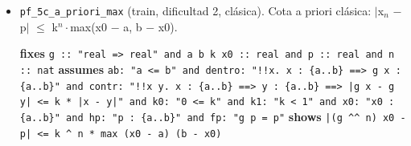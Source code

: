 \documentclass[11pt,a4paper]{article}
\begin{document}
\begin{itemize}
  {\footnotesize \textbf{fixes} \texttt{g :\allowbreak{}:\allowbreak{} "real =\allowbreak{}> real" and a b k x0 :\allowbreak{}:\allowbreak{} real and p :\allowbreak{}:\allowbreak{} real and n :\allowbreak{}:\allowbreak{} nat} \textbf{assumes} \texttt{ab:\allowbreak{} "a <=\allowbreak{} b" and dentro:\allowbreak{} "!{}!x. x :\allowbreak{} \{a..b\} =\allowbreak{}=\allowbreak{}> g x :\allowbreak{} \{a..b\}" and contr:\allowbreak{} "!{}!x y. x :\allowbreak{} \{a..b\} =\allowbreak{}=\allowbreak{}> y :\allowbreak{} \{a..b\} =\allowbreak{}=\allowbreak{}> |\allowbreak{}g x -\allowbreak{} g y|\allowbreak{} <=\allowbreak{} k *\allowbreak{} |\allowbreak{}x -\allowbreak{} y|\allowbreak{}" and k0:\allowbreak{} "0 <=\allowbreak{} k" and k1:\allowbreak{} "k < 1" and x0:\allowbreak{} "x0 :\allowbreak{} \{a..b\}" and hp:\allowbreak{} "p :\allowbreak{} \{a..b\}" and fp:\allowbreak{} "g p =\allowbreak{} p"} \textbf{shows} \texttt{|\allowbreak{}(\allowbreak{}g \textasciicircum{}\textasciicircum{} n) x0 -\allowbreak{} p|\allowbreak{} <=\allowbreak{} k \textasciicircum{} n *\allowbreak{} (\allowbreak{}b -\allowbreak{} a)}\par}
  \item \texttt{pf\_\allowbreak{}5c\_\allowbreak{}a\_\allowbreak{}priori\_\allowbreak{}max} (train, dificultad 2, clásica). Cota a priori clásica: $|$x$_{n}$ $-$ p$|$ $\le $ k$^{n}\cdot $max(x0 $-$ a, b $-$ x0).\\
  {\footnotesize \textbf{fixes} \texttt{g :\allowbreak{}:\allowbreak{} "real =\allowbreak{}> real" and a b k x0 :\allowbreak{}:\allowbreak{} real and p :\allowbreak{}:\allowbreak{} real and n :\allowbreak{}:\allowbreak{} nat} \textbf{assumes} \texttt{ab:\allowbreak{} "a <=\allowbreak{} b" and dentro:\allowbreak{} "!{}!x. x :\allowbreak{} \{a..b\} =\allowbreak{}=\allowbreak{}> g x :\allowbreak{} \{a..b\}" and contr:\allowbreak{} "!{}!x y. x :\allowbreak{} \{a..b\} =\allowbreak{}=\allowbreak{}> y :\allowbreak{} \{a..b\} =\allowbreak{}=\allowbreak{}> |\allowbreak{}g x -\allowbreak{} g y|\allowbreak{} <=\allowbreak{} k *\allowbreak{} |\allowbreak{}x -\allowbreak{} y|\allowbreak{}" and k0:\allowbreak{} "0 <=\allowbreak{} k" and k1:\allowbreak{} "k < 1" and x0:\allowbreak{} "x0 :\allowbreak{} \{a..b\}" and hp:\allowbreak{} "p :\allowbreak{} \{a..b\}" and fp:\allowbreak{} "g p =\allowbreak{} p"} \textbf{shows} \texttt{|\allowbreak{}(\allowbreak{}g \textasciicircum{}\textasciicircum{} n) x0 -\allowbreak{} p|\allowbreak{} <=\allowbreak{} k \textasciicircum{} n *\allowbreak{} max (\allowbreak{}x0 -\allowbreak{} a) (\allowbreak{}b -\allowbreak{} x0)}\par}

\end{itemize}
\end{document}

